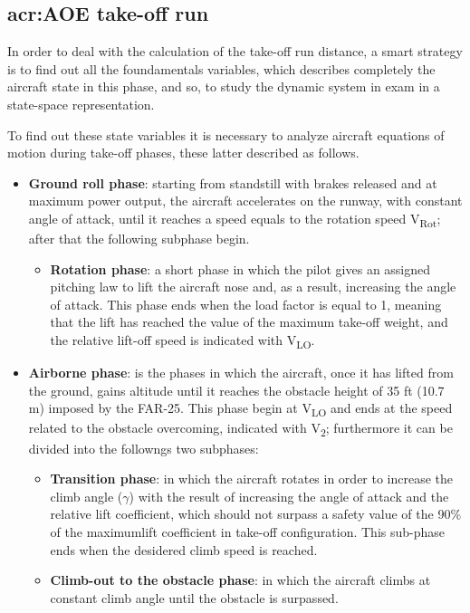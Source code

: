 \subsection{\gls{acr:AOE} take-off run}
In order to deal with the calculation of the take-off run distance, a smart strategy is to find out all the foundamentals variables, which describes completely the aircraft state in this phase, and so, to study the dynamic system in exam in a state-space representation.

\noindent
To find out these state variables it is necessary to analyze aircraft equations of motion during take-off phases, these latter described as follows.
\begin{itemize}
\item \textbf{Ground roll phase}: starting from standstill with brakes released and at maximum power output, the aircraft accelerates on the runway, with constant angle of attack, until it reaches a speed equals to the rotation speed V\textsubscript{Rot}; after that the following subphase begin.

\begin{itemize}
\item \textbf{Rotation phase}: a short phase in which the pilot gives an assigned pitching law to lift the aircraft nose and, as a result, increasing the angle of attack. This phase ends when the load factor is equal to 1, meaning that the lift has reached the value of the maximum take-off weight, and the relative lift-off speed is indicated with V\textsubscript{LO}. 

\end{itemize}

\item \textbf{Airborne phase}: is the phases in which the aircraft, once it has lifted from the ground, gains altitude until it reaches the obstacle height of 35 \si{ft} (10.7 \si{\meter}) imposed by the FAR-25. This phase begin at V\textsubscript{LO} and ends at the speed related to the obstacle overcoming, indicated with V\textsubscript{2}; furthermore it can be divided into the followngs two subphases:

\begin{itemize}
\item \textbf{Transition phase}: in which the aircraft rotates in order to increase the climb angle ($\gamma$) with the result of increasing the angle of attack and the relative lift coefficient, which should not surpass a safety value of the 90\% of the maximumlift coefficient in take-off configuration. This sub-phase ends when the desidered climb speed is reached.

\item \textbf{Climb-out to the obstacle phase}: in which the aircraft climbs at constant climb angle until the obstacle is surpassed.
\end{itemize}
\end{itemize}

